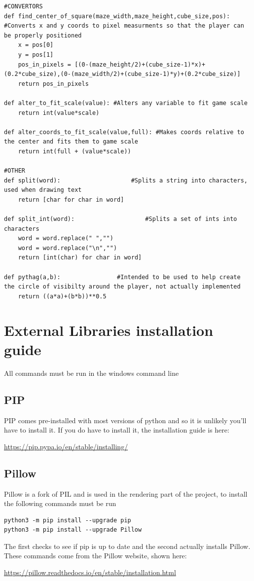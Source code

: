 \documentclass{article}
\begin{document}
\begin{lstlisting}
#CONVERTORS                    
def find_center_of_square(maze_width,maze_height,cube_size,pos): #Converts x and y coords to pixel measurments so that the player can be properly positioned 
    x = pos[0]                                                   
    y = pos[1]
    pos_in_pixels = [(0-(maze_height/2)+(cube_size-1)*x)+(0.2*cube_size),(0-(maze_width/2)+(cube_size-1)*y)+(0.2*cube_size)]
    return pos_in_pixels

def alter_to_fit_scale(value): #Alters any variable to fit game scale    
    return int(value*scale)

def alter_coords_to_fit_scale(value,full): #Makes coords relative to the center and fits them to game scale   
    return int(full + (value*scale))

#OTHER
def split(word):                    #Splits a string into characters, used when drawing text
    return [char for char in word]

def split_int(word):                    #Splits a set of ints into characters
    word = word.replace(" ","")
    word = word.replace("\n","")
    return [int(char) for char in word]

def pythag(a,b):                #Intended to be used to help create the circle of visibilty around the player, not actually implemented
    return ((a*a)+(b*b))**0.5
\end{lstlisting}

\clearpage
\section{External Libraries installation guide}
All commands must be run in the windows command line
\subsection{PIP}
PIP comes pre-installed with most versions of python and so it is unlikely you'll have to install it. If you do have to install it, the installation guide is here: 
\begin{center}
\url{https://pip.pypa.io/en/stable/installing/}
\end{center}
\subsection{Pillow}
Pillow is a fork of PIL and is used in the rendering part of the project, to install the following commands must be run
\begin{lstlisting}
python3 -m pip install --upgrade pip
python3 -m pip install --upgrade Pillow
\end{lstlisting}
The first checks to see if pip is up to date and the second actually installs Pillow. These commands come from the Pillow website, shown here:
\begin{center}
\url{https://pillow.readthedocs.io/en/stable/installation.html}
\end{center}
\end{document}
